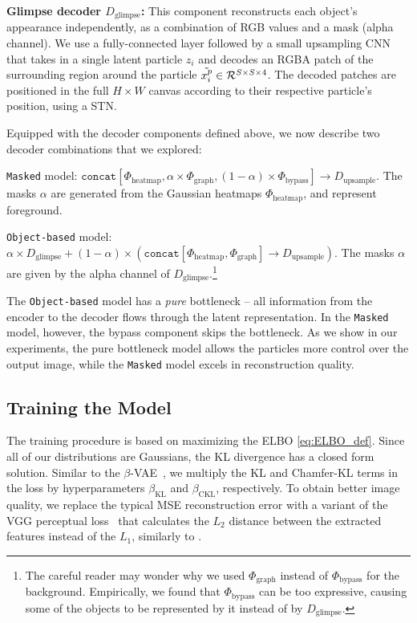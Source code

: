 \documentclass[nohyperref]{article}
\theoremstyle{plain}
\theoremstyle{definition}
\theoremstyle{remark}
\newcommand{\heatmapftrs}{\Phi_{\textrm{heatmap}}}
\newcommand{\dbypass}{\Phi_{\textrm{bypass}}}
\newcommand{\dgraph}{\Phi_{\textrm{graph}}}
\newcommand{\dglimpse}{D_{\textrm{glimpse}}}
\newcommand{\dupsample}{D_{\textrm{upsample}}}
\newenvironment{packed_enumerate}{
\begin{enumerate}
  \setlength{\itemsep}{1pt}
  \setlength{\parskip}{0pt}
  \setlength{\parsep}{0pt}
}{\end{enumerate}}
\begin{document}
\textbf{Glimpse decoder $\dglimpse$:} This component reconstructs each object's appearance independently, as a combination of RGB values and a mask (alpha channel).  We use a fully-connected layer followed by a small upsampling CNN that takes in a single latent particle $z_i$ and decodes an RGBA patch of the surrounding region around the particle $\Tilde{x^p_i} \in \mathcal{R}^{S \times S \times 4}$. The decoded patches are positioned in the full $H \times W$ canvas according to their respective particle's position, using a STN.



Equipped with the decoder components defined above, we now describe two  decoder combinations that we explored:
\begin{packed_enumerate}
\vspace{-1em}
\item \texttt{Masked} model: $\texttt{concat}[\heatmapftrs, \alpha \times \dgraph, (1-\alpha) \times \dbypass] \to \dupsample$. 
    The masks $\alpha$ are generated from the Gaussian heatmaps $\heatmapftrs$, and represent foreground. 
\item \texttt{Object-based} model: $\alpha \times \dglimpse + (1-\alpha)\times (\texttt{concat}[\heatmapftrs, \dgraph] \to \dupsample)$. The masks $\alpha$ are given by the alpha channel of $\dglimpse$.\footnote{The careful reader may wonder why we used $\dgraph$ instead of $\dbypass$ for the background. Empirically, we found that $\dbypass$ can be too expressive, causing some of the objects to be represented by it instead of by $\dglimpse$.}
\end{packed_enumerate}
\vspace{-1em}
The \texttt{Object-based} model has a \textit{pure} bottleneck -- all information from the encoder to the decoder flows through the latent representation. In the \texttt{Masked} model, however, the bypass component  skips the bottleneck. As we show in our experiments, the pure bottleneck model allows the particles more control over the output image, while the \texttt{Masked} model excels in reconstruction quality. 


\subsection{Training the Model}
\label{subsec:kp_vae_train}
The training procedure is based on maximizing the ELBO \eqref{eq:ELBO_def}.
Since all of our distributions are Gaussians, the KL divergence has a closed form solution. Similar to the $\beta$-VAE~\citep{higgins2017beta}, we multiply the KL and Chamfer-KL terms in the loss by hyperparameters $\beta_{\textrm{KL}}$ and $\beta_{\textrm{CKL}}$, respectively.
To obtain better image quality, we replace the typical MSE reconstruction error with a variant of the VGG perceptual loss~\citep{hoshen2019non} that calculates the $L_2$ distance between the extracted features instead of the $L_1$, similarly to \citet{jakab2018unsupervised}.
\end{document}
